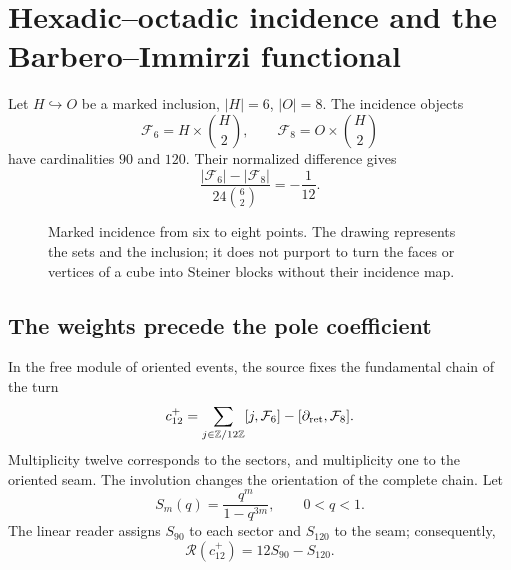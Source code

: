 \section{Hexadic--octadic incidence and the Barbero--Immirzi functional}
\label{v:ant:sec:barbero}
Let $H\hookrightarrow O$ be a marked inclusion, $|H|=6$, $|O|=8$.
The incidence objects
\[
\mathcal F_6=H\times\binom H2,\qquad
\mathcal F_8=O\times\binom H2
\]
have cardinalities $90$ and $120$. Their normalized difference gives
\[
\frac{|\mathcal F_6|-|\mathcal F_8|}{24\binom62}=-\frac1{12}.
\]

\begin{figure}[htbp]
\centering
{}
\caption{Marked incidence from six to eight points. The drawing represents
the sets and the inclusion; it does not purport to turn the faces or vertices
of a cube into Steiner blocks without their incidence map.}
\end{figure}

\subsection{The weights precede the pole coefficient}
In the free module of oriented events, the source fixes the
fundamental chain of the turn
\[
c_{12}^{+}=
\sum_{j\in\mathbb Z/12\mathbb Z}[j,\mathcal F_6]
-[\partial_{\rm ret},\mathcal F_8].
\]
Multiplicity twelve corresponds to the sectors, and multiplicity one
to the oriented seam. The involution changes the orientation of the complete
chain. Let
\[
S_m(q)=\frac{q^m}{1-q^{3m}},\qquad 0<q<1.
\]
The linear reader assigns $S_{90}$ to each sector and $S_{120}$ to the seam;
consequently,
\[
\mathscr R(c_{12}^{+})=12S_{90}-S_{120}.
\]

